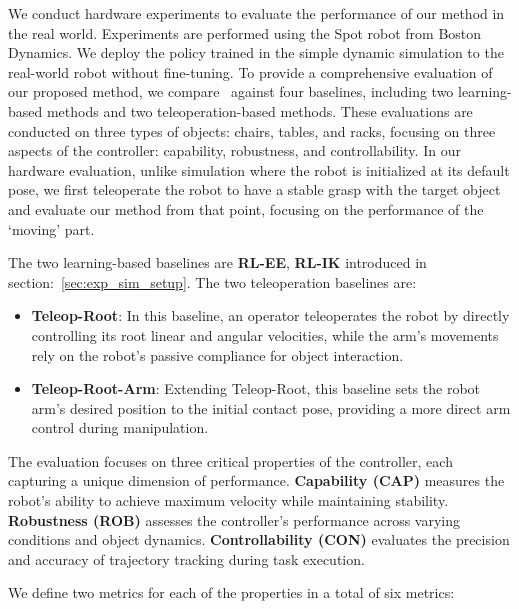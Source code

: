 We conduct hardware experiments to evaluate the performance of our method in the real world. Experiments are performed using the Spot robot from Boston Dynamics. We deploy the policy trained in the simple dynamic simulation to the real-world robot without fine-tuning. To provide a comprehensive evaluation of our proposed method, we compare \method~against four baselines, including two learning-based methods and two teleoperation-based methods. These evaluations are conducted on three types of objects: chairs, tables, and racks, focusing on three aspects of the controller: capability, robustness, and controllability. In our hardware evaluation, unlike simulation where the robot is initialized at its default pose, we first teleoperate the robot to have a stable grasp with the target object and evaluate our method from that point, focusing on the performance of the `moving' part.

The two learning-based baselines are \textbf{RL-EE}, \textbf{RL-IK} introduced in section:~\ref{sec:exp_sim_setup}. The two teleoperation baselines are:

\begin{itemize}
    \item \textbf{Teleop-Root}: In this baseline, an operator teleoperates the robot by directly controlling its root linear and angular velocities, while the arm's movements rely on the robot's passive compliance for object interaction.
    \item \textbf{Teleop-Root-Arm}: Extending Teleop-Root, this baseline sets the robot arm's desired position to the initial contact pose, providing a more direct arm control during manipulation.
\end{itemize}


The evaluation focuses on three critical properties of the controller, each capturing a unique dimension of performance. \textbf{Capability (CAP)} measures the robot's ability to achieve maximum velocity while maintaining stability. \textbf{Robustness (ROB)} assesses the controller's performance across varying conditions and object dynamics. \textbf{Controllability (CON)} evaluates the precision and accuracy of trajectory tracking during task execution.


We define two metrics for each of the properties in a total of six metrics:

